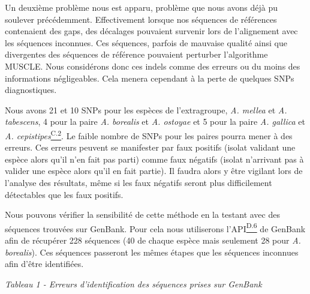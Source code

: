 

Un deuxième problème nous est apparu, problème que nous avons déjà pu soulever précédemment. Effectivement lorsque nos séquences de références contenaient des gaps, des décalages pouvaient survenir lors de l'alignement avec les séquences inconnues. Ces séquences, parfois de mauvaise qualité ainsi que divergentes des séquences de référence pouvaient perturber l'algorithme MUSCLE. Nous considérons donc ces indels comme des erreurs ou du moins des informations négligeables. Cela menera cependant à la perte de quelques SNPs diagnostiques.

Nous avons 21 et 10 SNPs pour les espèces de l'extragroupe, \textit{A. mellea} et \textit{A. tabescens}, 4 pour la paire \textit{A. borealis} et \textit{A. ostoyae} et 5 pour la paire \textit{A. gallica} et \textit{A. cepistipes}\hyperref[ann:annexeC2]{\textsuperscript{C.2}}. Le faible nombre de SNPs pour les paires pourra mener à des erreurs. Ces erreurs peuvent se manifester par faux positifs (isolat validant une espèce alors qu'il n'en fait pas parti) comme faux négatifs (isolat n'arrivant pas à valider une espèce alors qu'il en fait partie). Il faudra alors y être vigilant lors de l'analyse des résultats, même si les faux négatifs seront plus difficilement détectables que les faux positifs.

Nous pouvons vérifier la sensibilité de cette méthode en la testant avec des séquences trouvées sur GenBank. Pour cela nous utiliserons l'API\hyperref[ann:annexeD6]{\textsuperscript{D.6}} de GenBank afin de récupérer 228 séquences (40 de chaque espèce mais seulement 28 pour \textit{A. borealis}). Ces séquences passeront les mêmes étapes que les séquences inconnues afin d'être identifiées.

\begin{flushright}
\textit{Tableau 1 - Erreurs d'identification des séquences prises sur GenBank}
\end{flushright}

